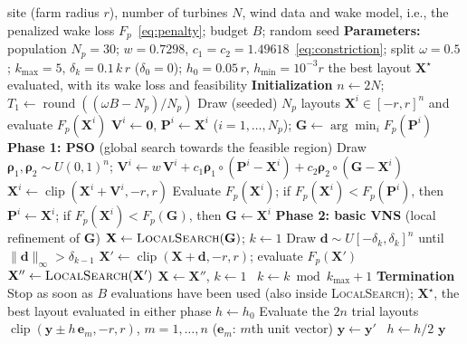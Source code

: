 \begin{algorithm}[!t]
\caption{PSO-VNS for the WFLOP (complete procedure; every call of $F_p$ counts against the budget $B$).}
\label{alg:hybrid}
\small
\begin{algorithmic}[1]
\Require site (farm radius $r$), number of turbines $N$, wind data and wake model, i.e., the penalized wake loss $F_p$~\eqref{eq:penalty}; budget $B$; random seed
\Statex \textbf{Parameters:} population $N_p=30$; $w=0.7298$, $c_1=c_2=1.49618$~\eqref{eq:constriction}; split $\omega=0.5$; $k_{\max}=5$, $\delta_k=0.1\,k\,r$ ($\delta_0=0$); $h_0=0.05\,r$, $h_{\min}=10^{-3}r$
\Ensure the best layout $\mathbf X^\star$ evaluated, with its wake loss and feasibility
\Statex \textbf{Initialization}
\State $n\gets2N$; $T_1\gets\operatorname{round}((\omega B-N_p)/N_p)$ 
\State Draw (seeded) $N_p$ layouts $\mathbf X^i\in[-r,r]^n$ and evaluate $F_p(\mathbf X^i)$ 
\State $\mathbf V^i\gets\mathbf 0$, $\mathbf P^i\gets\mathbf X^i$ ($i=1,\ldots,N_p$); $\mathbf G\gets\arg\min_i F_p(\mathbf P^i)$
\Statex \textbf{Phase 1: PSO} (global search towards the feasible region)
        \State Draw $\boldsymbol\rho_1,\boldsymbol\rho_2\sim U(0,1)^n$; $\mathbf V^i\gets w\,\mathbf V^i+c_1\boldsymbol\rho_1\circ(\mathbf P^i-\mathbf X^i)+c_2\boldsymbol\rho_2\circ(\mathbf G-\mathbf X^i)$
        \State $\mathbf X^i\gets\operatorname{clip}(\mathbf X^i+\mathbf V^i,-r,r)$ 
        \State Evaluate $F_p(\mathbf X^i)$; if $F_p(\mathbf X^i)<F_p(\mathbf P^i)$, then $\mathbf P^i\gets\mathbf X^i$; if $F_p(\mathbf X^i)<F_p(\mathbf G)$, then $\mathbf G\gets\mathbf X^i$
    \EndFor
\EndFor {}
\Statex \textbf{Phase 2: basic VNS} (local refinement of $\mathbf G$)
\State $\mathbf X\gets\textsc{LocalSearch}(\mathbf G)$; $k\gets1$
    \State Draw $\mathbf d\sim U[-\delta_k,\delta_k]^n$ until $\lVert\mathbf d\rVert_\infty>\delta_{k-1}$ 
    \State $\mathbf X'\gets\operatorname{clip}(\mathbf X+\mathbf d,-r,r)$; evaluate $F_p(\mathbf X')$
    \State $\mathbf X''\gets\textsc{LocalSearch}(\mathbf X')$
     $\mathbf X\gets\mathbf X''$, $k\gets1$ 
    \Else\ $k\gets k\bmod k_{\max}+1$ 
    \EndIf
\EndWhile
\Statex \textbf{Termination}
\State Stop as soon as $B$ evaluations have been used (also inside \textsc{LocalSearch}); \Return $\mathbf X^\star$, the best layout evaluated in either phase
\Statex
{} 
    \State $h\gets h_0$
        \State Evaluate the $2n$ trial layouts $\operatorname{clip}(\mathbf y\pm h\,\mathbf e_m,-r,r)$, $m=1,\ldots,n$ ($\mathbf e_m$: $m$th unit vector)
         $\mathbf y\gets\mathbf y'$ \Else\ $h\gets h/2$
        \EndIf
    \EndWhile
    \State \Return $\mathbf y$
\EndFunction
\end{algorithmic}
\end{algorithm}

